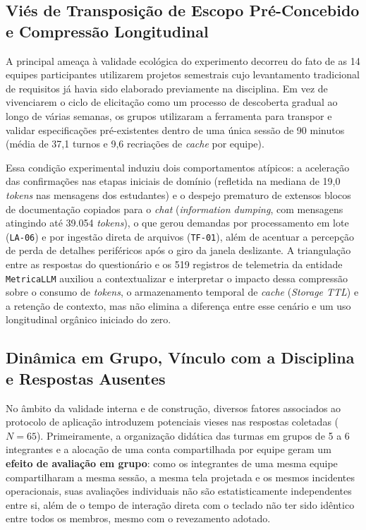 \subsection{Viés de Transposição de Escopo Pré-Concebido e Compressão Longitudinal}

A principal ameaça à validade ecológica do experimento decorreu do fato de as 14 equipes participantes utilizarem projetos semestrais cujo levantamento tradicional de requisitos já havia sido elaborado previamente na disciplina. Em vez de vivenciarem o ciclo de elicitação como um processo de descoberta gradual ao longo de várias semanas, os grupos utilizaram a ferramenta para transpor e validar especificações pré-existentes dentro de uma única sessão de 90 minutos (média de 37,1 turnos e 9,6 recriações de \textit{cache} por equipe).

Essa condição experimental induziu dois comportamentos atípicos: a aceleração das confirmações nas etapas iniciais de domínio (refletida na mediana de 19,0 \textit{tokens} nas mensagens dos estudantes) e o despejo prematuro de extensos blocos de documentação copiados para o \textit{chat} (\textit{information dumping}, com mensagens atingindo até 39.054 \textit{tokens}), o que gerou demandas por processamento em lote (\texttt{LA-06}) e por ingestão direta de arquivos (\texttt{TF-01}), além de acentuar a percepção de perda de detalhes periféricos após o giro da janela deslizante. A triangulação entre as respostas do questionário e os 519 registros de telemetria da entidade \texttt{MetricaLLM} auxiliou a contextualizar e interpretar o impacto dessa compressão sobre o consumo de \textit{tokens}, o armazenamento temporal de \textit{cache} (\textit{Storage TTL}) e a retenção de contexto, mas não elimina a diferença entre esse cenário e um uso longitudinal orgânico iniciado do zero.

\subsection{Dinâmica em Grupo, Vínculo com a Disciplina e Respostas Ausentes}

No âmbito da validade interna e de construção, diversos fatores associados ao protocolo de aplicação introduzem potenciais vieses nas respostas coletadas ($N = 65$). Primeiramente, a organização didática das turmas em grupos de 5 a 6 integrantes e a alocação de uma conta compartilhada por equipe geram um \textbf{efeito de avaliação em grupo}: como os integrantes de uma mesma equipe compartilharam a mesma sessão, a mesma tela projetada e os mesmos incidentes operacionais, suas avaliações individuais não são estatisticamente independentes entre si, além de o tempo de interação direta com o teclado não ter sido idêntico entre todos os membros, mesmo com o revezamento adotado.

